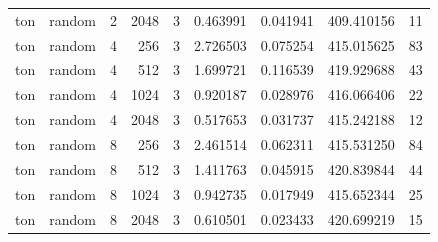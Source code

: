 \begin{tabular}{llrrrrrrr}
ton & random & 2 & 2048 & 3 & 0.463991 & 0.041941 & 409.410156 & 11 \\
ton & random & 4 & 256 & 3 & 2.726503 & 0.075254 & 415.015625 & 83 \\
ton & random & 4 & 512 & 3 & 1.699721 & 0.116539 & 419.929688 & 43 \\
ton & random & 4 & 1024 & 3 & 0.920187 & 0.028976 & 416.066406 & 22 \\
ton & random & 4 & 2048 & 3 & 0.517653 & 0.031737 & 415.242188 & 12 \\
ton & random & 8 & 256 & 3 & 2.461514 & 0.062311 & 415.531250 & 84 \\
ton & random & 8 & 512 & 3 & 1.411763 & 0.045915 & 420.839844 & 44 \\
ton & random & 8 & 1024 & 3 & 0.942735 & 0.017949 & 415.652344 & 25 \\
ton & random & 8 & 2048 & 3 & 0.610501 & 0.023433 & 420.699219 & 15 \\
\bottomrule
\end{tabular}
